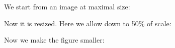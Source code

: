 \documentclass{article}
\begin{document}
We start from an image at maximal size:

{\centering{}\par}

Now it is resized.  Here we allow down to 50\% of scale:

{\centering{}\par}




Now we make the figure smaller:
\end{document}
